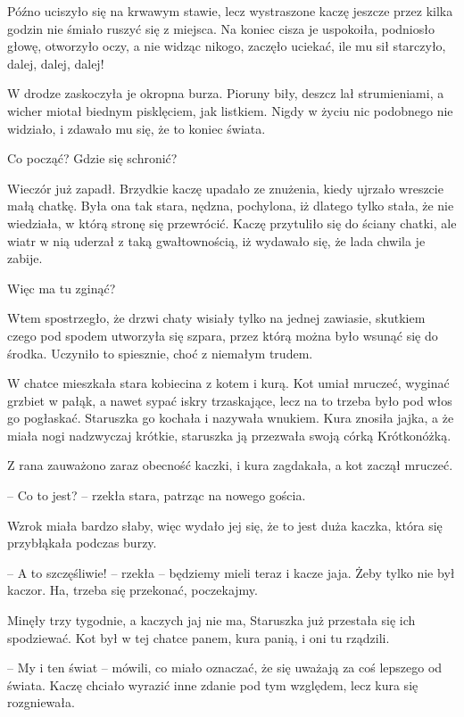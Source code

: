 \documentclass{book}
\begin{document}
Późno uciszyło się na krwawym stawie, lecz wystraszone kaczę jeszcze przez kilka godzin nie śmiało ruszyć się z miejsca. Na koniec cisza je uspokoiła, podniosło głowę, otworzyło oczy, a nie widząc nikogo, zaczęło uciekać, ile mu sił starczyło, dalej, dalej, dalej!

W drodze zaskoczyła je okropna burza. Pioruny biły, deszcz lał strumieniami, a wicher miotał biednym pisklęciem, jak listkiem. Nigdy w życiu nic podobnego nie widziało, i zdawało mu się, że to koniec świata.

Co począć? Gdzie się schronić?

Wieczór już zapadł. Brzydkie kaczę upadało ze znużenia, kiedy ujrzało wreszcie małą chatkę. Była ona tak stara, nędzna, pochylona, iż dlatego tylko stała, że nie wiedziała, w którą stronę się przewrócić. Kaczę przytuliło się do ściany chatki, ale wiatr w nią uderzał z taką gwałtownością, iż wydawało się, że lada chwila je zabije.

Więc ma tu zginąć?

Wtem spostrzegło, że drzwi chaty wisiały tylko na jednej zawiasie, skutkiem czego pod spodem utworzyła się szpara, przez którą można było wsunąć się do środka. Uczyniło to spiesznie, choć z niemałym trudem.

W chatce mieszkała stara kobiecina z kotem i kurą. Kot umiał mruczeć, wyginać grzbiet w pałąk, a nawet sypać iskry trzaskające, lecz na to trzeba było pod włos go pogłaskać. Staruszka go kochała i nazywała wnukiem. Kura znosiła jajka, a że miała nogi nadzwyczaj krótkie, staruszka ją przezwała swoją córką Krótkonóżką.

Z rana zauważono zaraz obecność kaczki, i kura zagdakała, a kot zaczął mruczeć.

-- Co to jest? -- rzekła stara, patrząc na nowego gościa.

Wzrok miała bardzo słaby, więc wydało jej się, że to jest duża kaczka, która się przybłąkała podczas burzy.

-- A to szczęśliwie! -- rzekła -- będziemy mieli teraz i kacze jaja. Żeby tylko nie był kaczor. Ha, trzeba się przekonać, poczekajmy.

Minęły trzy tygodnie, a kaczych jaj nie ma, Staruszka już przestała się ich spodziewać. Kot był w tej chatce panem, kura panią, i oni tu rządzili.

-- My i ten świat -- mówili, co miało oznaczać, że się uważają za coś lepszego od świata. Kaczę chciało wyrazić inne zdanie pod tym względem, lecz kura się rozgniewała.
\end{document}
